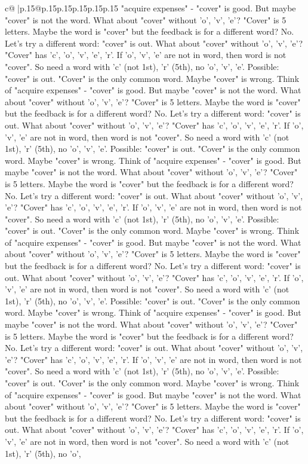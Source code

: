\documentclass{article}
\begin{document}
{\begin{supertabular}{c@{$\;$}|p{.15\linewidth}@{}p{.15\linewidth}p{.15\linewidth}p{.15\linewidth}p{.15\linewidth}p{.15\linewidth}}
{{{"acquire expenses" {-} "cover" is good. But maybe "cover" is not the word. What about "cover" without 'o', 'v', 'e'? "Cover" is 5 letters. Maybe the word is "cover" but the feedback is for a different word? No. Let's try a different word: "cover" is out. What about "cover" without 'o', 'v', 'e'? "Cover" has 'c', 'o', 'v', 'e', 'r'. If 'o', 'v', 'e' are not in word, then word is not "cover". So need a word with 'c' (not 1st), 'r' (5th), no 'o', 'v', 'e'. Possible: "cover" is out. "Cover" is the only common word. Maybe "cover" is wrong. Think of "acquire expenses" {-} "cover" is good. But maybe "cover" is not the word. What about "cover" without 'o', 'v', 'e'? "Cover" is 5 letters. Maybe the word is "cover" but the feedback is for a different word? No. Let's try a different word: "cover" is out. What about "cover" without 'o', 'v', 'e'? "Cover" has 'c', 'o', 'v', 'e', 'r'. If 'o', 'v', 'e' are not in word, then word is not "cover". So need a word with 'c' (not 1st), 'r' (5th), no 'o', 'v', 'e'. Possible: "cover" is out. "Cover" is the only common word. Maybe "cover" is wrong. Think of "acquire expenses" {-} "cover" is good. But maybe "cover" is not the word. What about "cover" without 'o', 'v', 'e'? "Cover" is 5 letters. Maybe the word is "cover" but the feedback is for a different word? No. Let's try a different word: "cover" is out. What about "cover" without 'o', 'v', 'e'? "Cover" has 'c', 'o', 'v', 'e', 'r'. If 'o', 'v', 'e' are not in word, then word is not "cover". So need a word with 'c' (not 1st), 'r' (5th), no 'o', 'v', 'e'. Possible: "cover" is out. "Cover" is the only common word. Maybe "cover" is wrong. Think of "acquire expenses" {-} "cover" is good. But maybe "cover" is not the word. What about "cover" without 'o', 'v', 'e'? "Cover" is 5 letters. Maybe the word is "cover" but the feedback is for a different word? No. Let's try a different word: "cover" is out. What about "cover" without 'o', 'v', 'e'? "Cover" has 'c', 'o', 'v', 'e', 'r'. If 'o', 'v', 'e' are not in word, then word is not "cover". So need a word with 'c' (not 1st), 'r' (5th), no 'o', 'v', 'e'. Possible: "cover" is out. "Cover" is the only common word. Maybe "cover" is wrong. Think of "acquire expenses" {-} "cover" is good. But maybe "cover" is not the word. What about "cover" without 'o', 'v', 'e'? "Cover" is 5 letters. Maybe the word is "cover" but the feedback is for a different word? No. Let's try a different word: "cover" is out. What about "cover" without 'o', 'v', 'e'? "Cover" has 'c', 'o', 'v', 'e', 'r'. If 'o', 'v', 'e' are not in word, then word is not "cover". So need a word with 'c' (not 1st), 'r' (5th), no 'o', 'v', 'e'. Possible: "cover" is out. "Cover" is the only common word. Maybe "cover" is wrong. Think of "acquire expenses" {-} "cover" is good. But maybe "cover" is not the word. What about "cover" without 'o', 'v', 'e'? "Cover" is 5 letters. Maybe the word is "cover" but the feedback is for a different word? No. Let's try a different word: "cover" is out. What about "cover" without 'o', 'v', 'e'? "Cover" has 'c', 'o', 'v', 'e', 'r'. If 'o', 'v', 'e' are not in word, then word is not "cover". So need a word with 'c' (not 1st), 'r' (5th), no 'o', }}}
\end{supertabular}}
\end{document}
